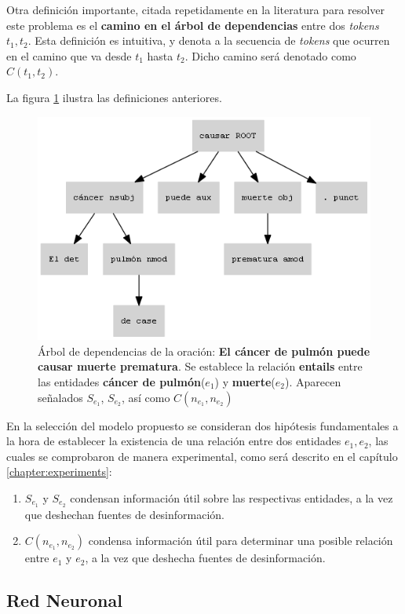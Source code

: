 Otra definición importante, citada repetidamente en la literatura para resolver este problema es el \textbf{camino en el árbol de dependencias} entre dos \textit{tokens} $t_1,t_2$.
Esta definición es intuitiva, y denota a la secuencia de \textit{tokens} que ocurren en el camino que va desde $t_1$ hasta $t_2$.
Dicho camino será denotado como $C(t_1,t_2)$.

La figura \ref{fig:dep_tree_ex} ilustra las definiciones anteriores.

\begin{figure}[h!]
	\centering
	\includegraphics[width=0.7\linewidth]{Graphics/dep_tree_ex.png}
	\caption{Árbol de dependencias de la oración: \textbf{El cáncer de pulmón puede causar muerte prematura}. Se establece la relación \textbf{entails} entre las entidades \textbf{cáncer de pulmón}($e_1$) y \textbf{muerte}($e_2$). Aparecen señalados $S_{e_1}$, $S_{e_2}$, así como $C(n_{e_1}, n_{e_2})$}\label{fig:dep_tree_ex}
\end{figure}

En la selección del modelo propuesto se consideran dos hipótesis fundamentales a la hora de establecer la existencia de una relación entre dos entidades $e_1,e_2$, las cuales se comprobaron de manera experimental, como será descrito en el capítulo \ref{chapter:experiments}:

\begin{enumerate}
	\item $S_{e_1}$ y $S_{e_2}$ condensan información útil sobre las respectivas entidades, a la vez que deshechan fuentes de desinformación.
	
	\item $C(n_{e_1}, n_{e_2})$ condensa información útil para determinar una posible relación entre $e_1$ y $e_2$, a la vez que deshecha fuentes de desinformación.
\end{enumerate}

\subsection{Red Neuronal}

